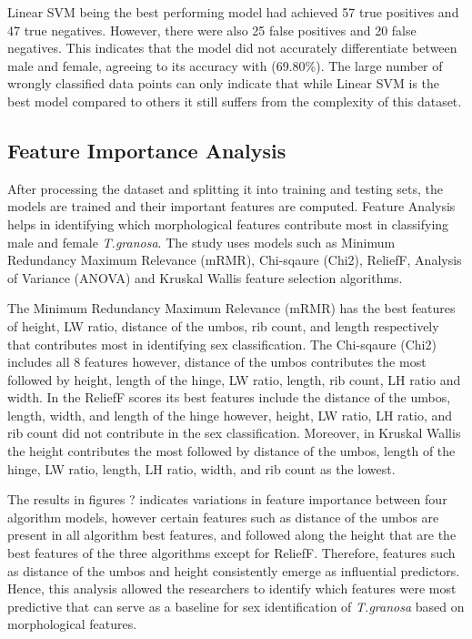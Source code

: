 Linear SVM being the best performing model had achieved 57 true positives and 47 true negatives. However, there were also 25 false positives and 20 false negatives. This indicates that the model did not accurately differentiate  between male and female, agreeing to its accuracy with (69.80\%). The large number of wrongly classified data points can only indicate that while Linear SVM is the best model compared to others it still suffers from the complexity of this dataset. 


\subsection{Feature Importance Analysis}

After processing the dataset and splitting it into training and testing sets, the models are trained and their important features are computed. Feature Analysis helps in identifying which morphological features contribute most in classifying male and female \textit{T.granosa}. The study uses models such as Minimum Redundancy Maximum Relevance (mRMR), Chi-sqaure (Chi2), ReliefF, Analysis of Variance (ANOVA) and Kruskal Wallis feature selection algorithms. 

The Minimum Redundancy Maximum Relevance (mRMR) has the best features of height, LW ratio, distance of the umbos, rib count, and length respectively that contributes most in identifying sex classification. The Chi-sqaure (Chi2) includes all 8 features however, distance of the umbos contributes the most followed by height, length of the hinge, LW ratio, length, rib count, LH ratio and width. In the ReliefF scores its best features include the distance of the umbos, length, width, and length of the hinge however, height, LW ratio, LH ratio, and rib count did not contribute in the sex classification. Moreover, in Kruskal Wallis the height contributes the most followed by distance of the umbos, length of the hinge, LW ratio, length, LH ratio, width, and rib count as the lowest. 

The results in figures ?  indicates variations in feature importance between four algorithm models, however certain features such as distance of the umbos are present in all algorithm best features, and followed along the height that are the best features of the three algorithms except for ReliefF. Therefore, features such as distance of the umbos and height consistently emerge as influential predictors. Hence, this analysis allowed the researchers to identify which features were most predictive that can serve as a baseline for sex identification of \textit{T.granosa} based on morphological features. 




